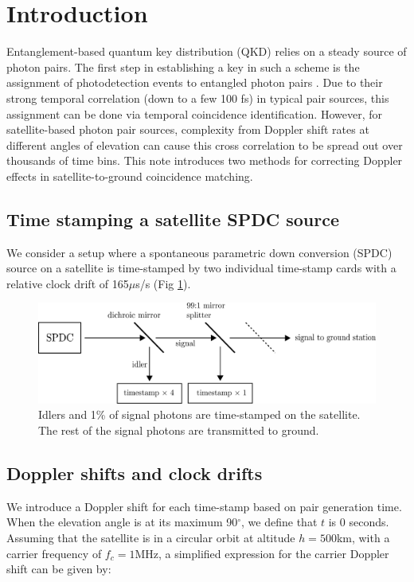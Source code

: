 \section{Introduction}
Entanglement-based quantum key distribution (QKD) relies on a steady source of photon pairs. The first step in establishing a key in such a scheme is the assignment of photodetection events to entangled photon pairs \cite{ho2009clock}. Due to their strong temporal correlation (down to a few 100 fs) in typical pair sources, this assignment can be done via temporal coincidence identification. However, for satellite-based photon pair sources, complexity from Doppler shift rates at different angles of elevation can cause this cross correlation to be spread out over thousands of time bins. This note introduces two methods for correcting Doppler effects in satellite-to-ground coincidence matching. 

\subsection{Time stamping a satellite SPDC source}

We consider a setup where a spontaneous parametric down conversion (SPDC) source on a satellite is time-stamped by two individual time-stamp cards with a relative clock drift of 165$\mu$s/s (Fig \ref{fig:spdc_source}).\\ 

\begin{figure}[ht!]
	\includegraphics[width=\linewidth]{assets/spdc_source}
	\caption{Idlers and 1\% of signal photons are time-stamped on the satellite. The rest of the signal photons are transmitted to ground.}
	\label{fig:spdc_source}
\end{figure}

\newpage

\subsection{Doppler shifts and clock drifts}
We introduce a Doppler shift for each time-stamp based on pair generation time. When the elevation angle is at its maximum 90$^\circ$, we define that $t$ is 0 seconds. Assuming that the satellite is in a circular orbit at altitude $h = 500$km, with a carrier frequency of $f_c = 1$MHz, a simplified expression for the carrier Doppler shift can be given by:

